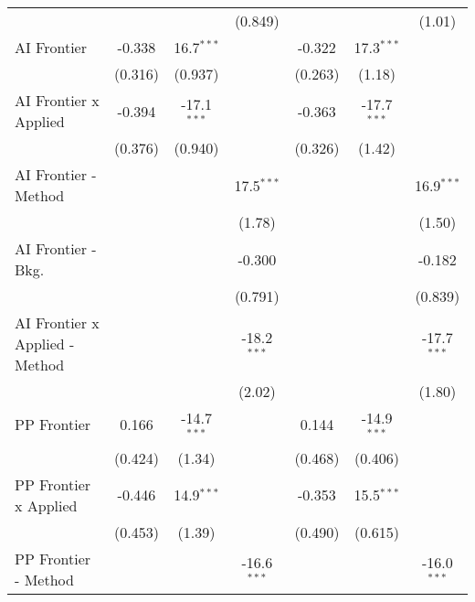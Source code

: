 \begin{tabular}{lcccccc}
                                  &                &                & (0.849)       &                &               & (1.01)\\   
   AI Frontier                    & -0.338         & 16.7$^{***}$   &               & -0.322         & 17.3$^{***}$  &   \\   
                                  & (0.316)        & (0.937)        &               & (0.263)        & (1.18)        &   \\   
   AI Frontier x Applied          & -0.394         & -17.1$^{***}$  &               & -0.363         & -17.7$^{***}$ &   \\   
                                  & (0.376)        & (0.940)        &               & (0.326)        & (1.42)        &   \\   
   AI Frontier - Method           &                &                & 17.5$^{***}$  &                &               & 16.9$^{***}$\\   
                                  &                &                & (1.78)        &                &               & (1.50)\\   
   AI Frontier - Bkg.             &                &                & -0.300        &                &               & -0.182\\   
                                  &                &                & (0.791)       &                &               & (0.839)\\   
   AI Frontier x Applied - Method &                &                & -18.2$^{***}$ &                &               & -17.7$^{***}$\\   
                                  &                &                & (2.02)        &                &               & (1.80)\\   
   PP Frontier                    & 0.166          & -14.7$^{***}$  &               & 0.144          & -14.9$^{***}$ &   \\   
                                  & (0.424)        & (1.34)         &               & (0.468)        & (0.406)       &   \\   
   PP Frontier x Applied          & -0.446         & 14.9$^{***}$   &               & -0.353         & 15.5$^{***}$  &   \\   
                                  & (0.453)        & (1.39)         &               & (0.490)        & (0.615)       &   \\   
   PP Frontier - Method           &                &                & -16.6$^{***}$ &                &               & -16.0$^{***}$\\   

\end{tabular}
